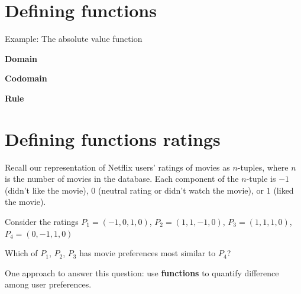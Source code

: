 \documentclass[12pt, oneside]{article}
\begin{document}
\section*{Defining functions}



\vfill
\newpage

Example: The absolute value function 

{\bf Domain}

{\bf Codomain}

{\bf Rule}

\vfill 
 \vfill
\section*{Defining functions ratings}


Recall our representation of Netflix users' ratings of movies as $n$-tuples, where
$n$ is the number of movies in the database. 
Each component of the $n$-tuple is $-1$ (didn't like the movie), $0$ 
(neutral rating or didn't watch the movie), or $1$ (liked the movie).

Consider the ratings $P_1 = (-1, 0, 1, 0)$, $P_2 = (1, 1, -1, 0)$, $P_3 = (1, 1, 1, 0)$,
$P_4 = (0,-1,1, 0)$


Which of $P_1$, $P_2$, $P_3$ has movie preferences most similar to $P_4$?

One approach to answer this question: use {\bf functions} to quantify difference among user preferences.
\end{document}
